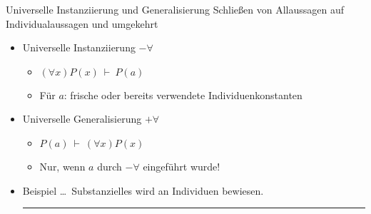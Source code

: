 \begin{frame}
  {Universelle Instanziierung und Generalisierung}
  \onslide<+->
  \onslide<+->
  Schließen von \alert{Allaussagen} auf \alert{Individualaussagen} und umgekehrt\\
  \Halbzeile
  \begin{itemize}[<+->]
    \item Universelle Instanziierung \alert{$-\forall$}
      \begin{itemize}[<+->]
        \item \alert{$(\forall x)P(x)\ \vdash\ P(a)$}\\
        \item Für $a$: frische oder bereits verwendete Individuenkonstanten
      \end{itemize}
      \Halbzeile
    \item Universelle Generalisierung \alert{$+\forall$}
      \begin{itemize}[<+->]
        \item \alert{$P(a)\ \vdash\ (\forall x)P(x)$}
        \item Nur, wenn $a$ durch $-\forall$ eingeführt wurde!
      \end{itemize}
      \Halbzeile
    \item Beispiel \ldots\ \alert{Substanzielles wird an Individuen bewiesen.}\\
      \onslide<+->
      \Viertelzeile
      \rule{4em}{0em}
  \end{itemize}
\end{frame}

